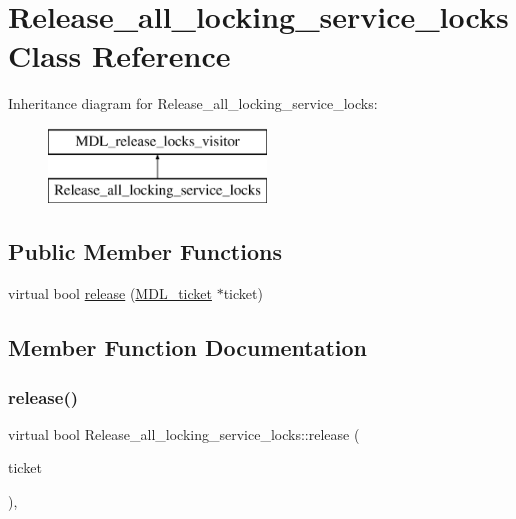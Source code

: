 \hypertarget{classRelease__all__locking__service__locks}{}\section{Release\+\_\+all\+\_\+locking\+\_\+service\+\_\+locks Class Reference}
\label{classRelease__all__locking__service__locks}
Inheritance diagram for Release\+\_\+all\+\_\+locking\+\_\+service\+\_\+locks\+:\begin{figure}[H]
\begin{center}
\leavevmode
\includegraphics[height=2.000000cm]{classRelease__all__locking__service__locks}
\end{center}
\end{figure}
\subsection*{Public Member Functions}
\begin{DoxyCompactItemize}
\item 
virtual bool \mbox{\hyperlink{classRelease__all__locking__service__locks_a7578e5263f465bfc6acb3ac35d137501}{release}} (\mbox{\hyperlink{classMDL__ticket}{M\+D\+L\+\_\+ticket}} $\ast$ticket)
\end{DoxyCompactItemize}


\subsection{Member Function Documentation}
\mbox{\label{classRelease__all__locking__service__locks_a7578e5263f465bfc6acb3ac35d137501}} 
\subsubsection{\texorpdfstring{release()}{release()}}
{\footnotesize\ttfamily virtual bool Release\+\_\+all\+\_\+locking\+\_\+service\+\_\+locks\+::release (\begin{DoxyParamCaption}\item[{\mbox{\hyperlink{classMDL__ticket}{M\+D\+L\+\_\+ticket}} $\ast$}]{ticket }\end{DoxyParamCaption})\hspace{0.3cm}{\ttfamily [inline]}, {\ttfamily [virtual]}}

